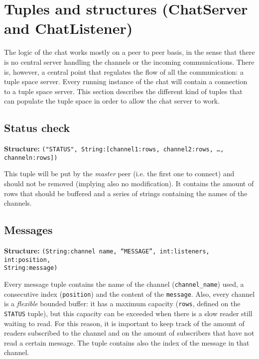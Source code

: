 \documentclass[paper=a4, fontsize=11pt]{scrartcl} %
\begin{document}
\section{Tuples and structures (ChatServer and ChatListener)}

The logic of the chat works mostly on a peer to peer basis, in the sense that there is no central server handling the channels or the incoming communications. There is, however, a central point that regulates the flow of all the communication: a tuple space server. Every running instance of the chat will contain a connection to a tuple space server. This section describes the different kind of tuples that can populate the tuple space in order to allow the chat server to work. 

\subsection{Status check}

\textbf{Structure:} \verb|("STATUS", String:[channel1:rows, channel2:rows, …, channeln:rows])|

This tuple will be put by the \emph{master} peer (i.e. the first one to connect) and should not be removed (implying also no modification). It contains the amount of rows that should be buffered and a series of strings containing the names of the channels.

\subsection{Messages}

\textbf{Structure:} \texttt{(String:channel name, ``MESSAGE'', int:listeners, int:position,\\ String:message)}


Every message tuple contains the name of the channel (\verb|channel_name|) used, a consecutive index (\verb|position|) and the content of the \verb|message|. Also, every channel is a \emph{flexible} bounded buffer: it has a maximum capacity (\verb|rows|, defined on the \verb|STATUS| tuple), but this capacity can be exceeded when there is a slow reader still waiting to read. For this reason, it is important to keep track of the amount of readers subscribed to the channel and on the amount of subscribers that have not read a certain message. The tuple contains also the index of the message in that channel.
\end{document}
